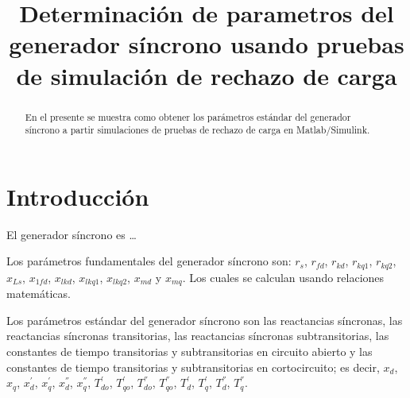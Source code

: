 \documentclass[conference]{IEEEtran}
\begin{document}
\title{Determinación de parametros del generador síncrono usando pruebas de simulación de rechazo de carga}


\author{
}


\maketitle

\thispagestyle{firststyle}
\renewcommand{\headrulewidth}{0in}
\pagestyle{empty}

\pagestyle{fancy}
\chead{\fontsize{8}{10} \selectfont \textit{} }

\begin{abstract}
	En el presente se muestra como obtener los parámetros estándar del generador síncrono a partir simulaciones de pruebas de rechazo de carga en Matlab/Simulink.
\end{abstract}

\section{Introducción}
El generador síncrono es \dots

Los parámetros fundamentales del generador síncrono son: $r_s$, $r_{fd}$, $r_{kd}$, $r_{kq1}$, $r_{kq2}$, $x_{Ls}$, $x_{1fd}$, $x_{lkd}$, $x_{lkq1}$, $x_{lkq2}$, $x_{md}$ y $x_{mq}$. Los cuales se calculan usando relaciones matemáticas.

Los parámetros estándar del generador síncrono son las reactancias síncronas, las reactancias síncronas transitorias, las reactancias síncronas subtransitorias, las constantes de tiempo transitorias y subtransitorias en circuito abierto y las constantes de tiempo transitorias y subtransitorias en cortocircuito; es decir, $x_d$, $x_q$, $x^{'}_d$, $x^{'}_q$, $x^{''}_d$, $x^{''}_q$, $T^{'}_{do}$, $T^{'}_{qo}$, $T^{''}_{do}$, $T^{''}_{qo}$, $T^{'}_{d}$, $T^{'}_{q}$, $T^{''}_{d}$, $T^{''}_{q}$.
\end{document}
